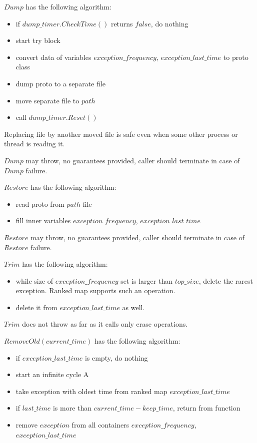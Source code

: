 \documentclass{article}
\begin{document}
$Dump$ has the following algorithm:
\begin{itemize}
	\item if $dump\_timer.CheckTime()$ returns $false$, do nothing
	\item start try block
	\item convert data of variables $exception\_frequency$, $exception\_last\_time$ to proto class
	\item dump proto to a separate file
	\item move separate file to $path$
	\item call $dump\_timer.Reset()$
\end{itemize}

Replacing file by another moved file is safe even when some other process or thread is reading it.

$Dump$ may throw, no guarantees provided, caller should terminate in case of $Dump$ failure.

$Restore$ has the following algorithm:
\begin{itemize}
	\item read proto from $path$ file
	\item fill inner variables $exception\_frequency$, $exception\_last\_time$
\end{itemize}

$Restore$ may throw, no guarantees provided, caller should terminate in case of $Restore$ failure.

$Trim$ has the following algorithm:
\begin{itemize}
	\item while size of $exception\_frequency$ set is larger than $top\_size$, delete the rarest exception. Ranked map supports such an operation.
	\item delete it from $exception\_last\_time$ as well.
\end{itemize}

$Trim$ does not throw as far as it calls only erase operations.

$RemoveOld(current\_time)$ has the following algorithm:
\begin{itemize}
	\item if $exception\_last\_time$ is empty, do nothing
	\item start an infinite cycle A
	\item take exception with oldest time from ranked map $exception\_last\_time$
	\item if $last\_time$ is more than $current\_time - keep\_time$, return from function
	\item remove $exception$ from all containers $exception\_frequency$, \\
		$exception\_last\_time$
\end{itemize}
\end{document}
